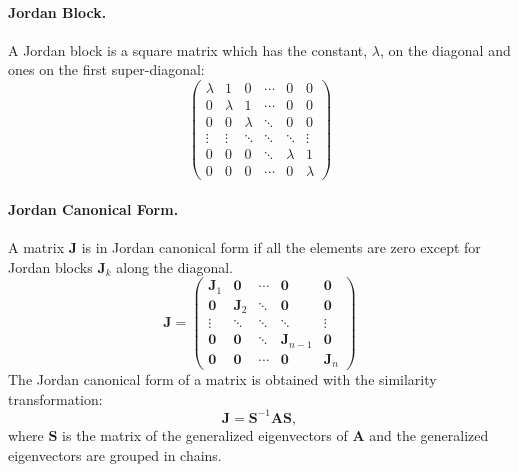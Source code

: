 \paragraph{Jordan Block.}
A Jordan block is a square matrix which has the constant, $\lambda$,
on the diagonal and ones on the first super-diagonal:
\[
\begin{pmatrix}
  \lambda      & 1     & 0     &\cdots     & 0     & 0     \\
  0       &\lambda& 1  &\cdots & 0         & 0     \\
  0       & 0     &\lambda&\ddots & 0      & 0     \\
  \vdots      &\vdots     &\ddots &\ddots &\ddots &\vdots \\
  0       & 0     & 0     &\ddots     &\lambda& 1  \\
  0       & 0     & 0     &\cdots     & 0     &\lambda
\end{pmatrix}
\]



\paragraph{Jordan Canonical Form.}
A matrix $\mathbf{J}$ is in Jordan canonical form if all the elements are zero 
except for Jordan blocks $\mathbf{J}_k$ along the diagonal.
\[
\mathbf{J} = 
\begin{pmatrix}
  \mathbf{J}_1  & \mathbf{0}  &\cdots     & \mathbf{0}  & \mathbf{0} \\
  \mathbf{0}    &\mathbf{J}_2 &\ddots     & \mathbf{0}  & \mathbf{0} \\
  \vdots      &\ddots     &\ddots &\ddots &\vdots\\
  \mathbf{0}    & \mathbf{0}  &\ddots     & \mathbf{J}_{n-1}& \mathbf{0} \\
  \mathbf{0}    & \mathbf{0}  &\cdots     & \mathbf{0}  & \mathbf{J}_n
\end{pmatrix}
\]
The Jordan canonical form of a matrix is obtained with the similarity
transformation:
\[
\mathbf{J} = \mathbf{S}^{-1} \mathbf{A} \mathbf{S},
\]
where $\mathbf{S}$ is the matrix of the generalized eigenvectors of $\mathbf{A}$ and
the generalized eigenvectors are grouped in chains.






